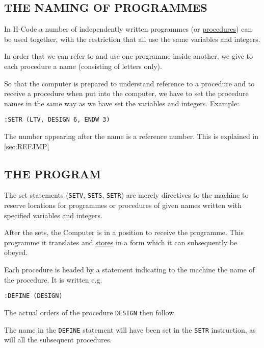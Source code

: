 \documentclass[10pt, a4paper, oneside]{article}
\newcommand{\myuline}[1]{\uline{#1}}
\newcommand{\mytt}[1]{\texttt{\footnotesize #1}}
\begin{document}
\begin{multicols}{2}
\subsection{THE NAMING OF PROGRAMMES}

In H-Code a number of independently written
programmes (or \myuline{procedures}) can be used together, with
the restriction that all use the same variables and
integers.

In order that we can refer to and use one
programme inside another, we give to each procedure a
name (consisting of letters only).

So that the computer is prepared to understand
reference to a procedure and to receive a procedure
when put into the computer, we have to set the
procedure names in the same way as we have set the
variables and integers.
Example:

\begin{addmargin}[1cm]{1em}%
\begin{lstlisting}
:SETR (LTV, DESIGN 6, ENDW 3)
\end{lstlisting}
\end{addmargin}

The number appearing after the name is a
reference number.  This is explained in \ref{sec:REFJMP}

\subsection{THE PROGRAM}

The set statements (\mytt{SETV}, \mytt{SETS}, \mytt{SETR}) are
merely directives to the machine to reserve locations
for programmes or procedures of given names written
with specified variables and integers.

After the sets, the Computer is in a position
to receive the programme.  This programme it
translates and \myuline{stores} in a form which it can
subsequently be obeyed.

Each procedure is headed by a statement
indicating to the machine the name of the procedure.
It is written e.g.

\begin{addmargin}[1cm]{1em}%
\begin{lstlisting}
:DEFINE (DESIGN)
\end{lstlisting}
\end{addmargin}

The actual orders of the procedure \mytt{DESIGN} then
follow.

The name in the \mytt{DEFINE} statement will have been
set in the \mytt{SETR} instruction, as will all the subsequent
procedures.


\end{multicols}
\end{document}
